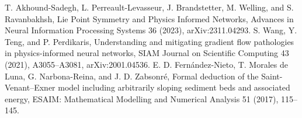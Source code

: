 T. Akhound-Sadegh, L. Perreault-Levasseur, J. Brandstetter, M. Welling,
and S. Ravanbakhsh, Lie Point Symmetry and Physics Informed Networks,
Advances in Neural Information Processing Systems 36 (2023), arXiv:2311.04293.
S. Wang, Y. Teng, and P. Perdikaris, Understanding and mitigating gradient
flow pathologies in physics-informed neural networks,
SIAM Journal on Scientific Computing 43 (2021), A3055--A3081, arXiv:2001.04536.
E. D. Fern\'andez-Nieto, T. Morales de Luna, G. Narbona-Reina, and J. D. Zabsonr\'e,
Formal deduction of the Saint-Venant--Exner model including arbitrarily
sloping sediment beds and associated energy,
ESAIM: Mathematical Modelling and Numerical Analysis 51 (2017), 115--145.
